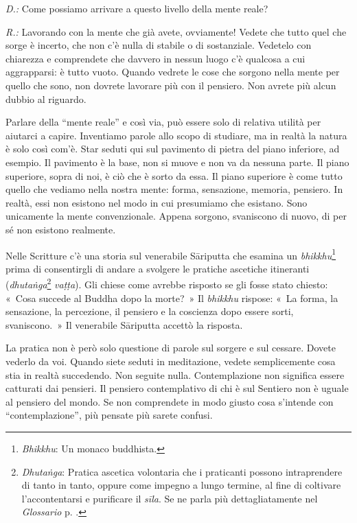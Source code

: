 \emph{D.:} Come possiamo arrivare a questo livello della mente reale?

\emph{R.:} Lavorando con la mente che già avete, ovviamente! Vedete che tutto
quel che sorge è incerto, che non c'è nulla di stabile o di sostanziale.
Vedetelo con chiarezza e comprendete che davvero in nessun luogo c'è
qualcosa a cui aggrapparsi: è tutto vuoto. Quando vedrete le cose che
sorgono nella mente per quello che sono, non dovrete lavorare più con il
pensiero. Non avrete più alcun dubbio al riguardo.

Parlare della ``mente reale'' e così via, può essere solo di relativa
utilità per aiutarci a capire. Inventiamo parole allo scopo di studiare,
ma in realtà la natura è solo così com'è. Star seduti qui sul pavimento
di pietra del piano inferiore, ad esempio. Il pavimento è la base, non
si muove e non va da nessuna parte. Il piano superiore, sopra di noi, è
ciò che è sorto da essa. Il piano superiore è come tutto quello che
vediamo nella nostra mente: forma, sensazione, memoria, pensiero. In
realtà, essi non esistono nel modo in cui presumiamo che esistano. Sono
unicamente la mente convenzionale. Appena sorgono, svaniscono di nuovo,
di per sé non esistono realmente.

Nelle Scritture c'è una storia sul venerabile Sāriputta che esamina un
\emph{bhikkhu}\footnote{\emph{Bhikkhu}: Un monaco buddhista.} prima di
consentirgli di andare a svolgere le pratiche ascetiche itineranti
(\emph{dhutaṅga}\footnote{\emph{Dhutaṅga}: Pratica ascetica volontaria
  che i praticanti possono intraprendere di tanto in tanto, oppure come
  impegno a lungo termine, al fine di coltivare l'accontentarsi e
  purificare il \emph{sīla}. Se ne parla più dettagliatamente nel
  \emph{Glossario} p. \pageref{glossary-dhutanga}.} \emph{vaṭṭa}). Gli chiese come avrebbe risposto se
gli fosse stato chiesto: «~Cosa succede al Buddha dopo la morte?~» Il
\emph{bhikkhu} rispose: «~La forma, la sensazione, la percezione, il
pensiero e la coscienza dopo essere sorti, svaniscono.~» Il venerabile
Sāriputta accettò la risposta.

La pratica non è però solo questione di parole sul sorgere e sul
cessare. Dovete vederlo da voi. Quando siete seduti in meditazione,
vedete semplicemente cosa stia in realtà succedendo. Non seguite nulla.
Contemplazione non significa essere catturati dai pensieri. Il pensiero
contemplativo di chi è sul Sentiero non è uguale al pensiero del mondo.
Se non comprendete in modo giusto cosa s'intende con ``contemplazione'',
più pensate più sarete confusi.

